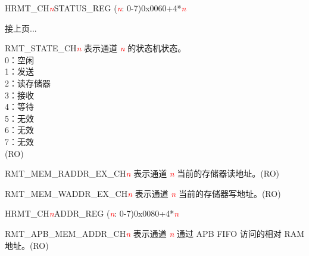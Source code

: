 \addtocounter{Regfloat}{-1}
\begin{register}{H}{RMT\_CH\textcolor{red}{\it{n}}STATUS\_REG (\textcolor{red}{\it{n}}: 0-7)}{0x0060+4*\textcolor{red}{\it{n}}}
\begin{regdesc}\begin{reglist}
\item [接上页...]

\item [RMT\_STATE\_CH\textcolor{red}{\it{n}}] 表示通道 \textcolor{red}{\it{n}} 的状态机状态。\\
0：空闲\\
1：发送\\
2：读存储器\\
3：接收\\
4：等待\\
5：无效\\
6：无效\\
7：无效\\(RO)
\item [RMT\_MEM\_RADDR\_EX\_CH\textcolor{red}{\it{n}}] 表示通道 \textcolor{red}{\it{n}} 当前的存储器读地址。(RO)
\item [RMT\_MEM\_WADDR\_EX\_CH\textcolor{red}{\it{n}}] 表示通道 \textcolor{red}{\it{n}} 当前的存储器写地址。(RO)
\end{reglist}\end{regdesc}
\end{register}


\begin{register}{H}{RMT\_CH\textcolor{red}{\it{n}}ADDR\_REG (\textcolor{red}{\it{n}}: 0-7)}{0x0080+4*\textcolor{red}{\it{n}}}\label{regdesc:RMTCHnADDRREG}
%
\regnewline%
\begin{regdesc}\begin{reglist}
\item [RMT\_APB\_MEM\_ADDR\_CH\textcolor{red}{\it{n}}] 表示通道 \textcolor{red}{\it{n}} 通过 APB FIFO 访问的相对 RAM 地址。(RO)
\end{reglist}\end{regdesc}
\end{register}


